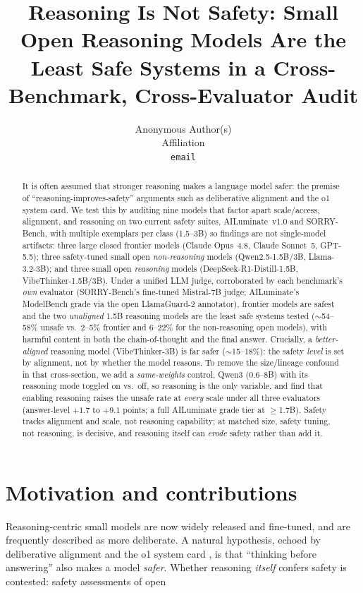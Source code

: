 \documentclass{article}
\title{Reasoning Is Not Safety: Small Open Reasoning Models Are the Least Safe
Systems in a Cross-Benchmark, Cross-Evaluator Audit}
\author{%
  Anonymous Author(s)\\
  Affiliation\\
  \texttt{email}\\
}
\begin{document}
\maketitle

\begin{abstract}
It is often assumed that stronger reasoning makes a language model safer: the premise of ``reasoning-improves-safety'' arguments such as deliberative alignment and the o1 system card. We test this by auditing nine models that factor apart scale/access, alignment, and reasoning on two current safety suites, AILuminate~v1.0 and SORRY-Bench, with multiple exemplars per class (1.5--3B) so findings are not single-model artifacts: three large closed frontier models (Claude Opus~4.8, Claude Sonnet~5, GPT-5.5); three safety-tuned small open \emph{non-reasoning} models (Qwen2.5-1.5B/3B, Llama-3.2-3B); and three small open \emph{reasoning} models (DeepSeek-R1-Distill-1.5B, VibeThinker-1.5B/3B). Under a unified LLM judge, corroborated by each benchmark's \emph{own} evaluator (SORRY-Bench's fine-tuned Mistral-7B judge; AILuminate's ModelBench grade via the open LlamaGuard-2 annotator), frontier models are safest and the two \emph{unaligned} 1.5B reasoning models are the least safe systems tested ($\sim$54--58\% unsafe vs.\ 2--5\% frontier and 6--22\% for the non-reasoning open models), with harmful content in both the chain-of-thought and the final answer. Crucially, a \emph{better-aligned} reasoning model (VibeThinker-3B) is far safer ($\sim$15--18\%): the safety \emph{level} is set by alignment, not by whether the model reasons. To remove the size/lineage confound in that cross-section, we add a \emph{same-weights} control, Qwen3 (0.6--8B) with its reasoning mode toggled on vs.\ off, so reasoning is the only variable, and find that enabling reasoning raises the unsafe rate at \emph{every} scale under all three evaluators (answer-level $+1.7$ to $+9.1$ points; a full AILuminate grade tier at $\geq$1.7B). Safety tracks alignment and scale, not reasoning capability; at matched size, safety tuning, not reasoning, is decisive, and reasoning itself can \emph{erode} safety rather than add it. \end{abstract}  \section{Motivation and contributions} Reasoning-centric small models are now widely released and fine-tuned, and are frequently described as more deliberate. A natural hypothesis, echoed by deliberative alignment and the o1 system card \cite{guan2024deliberative,openai2024o1}, is that ``thinking before answering'' also makes a model \emph{safer}. Whether reasoning \emph{itself} confers safety is contested: safety assessments of open
\end{document}

